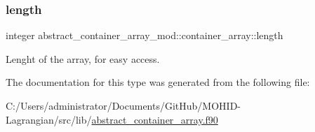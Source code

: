 \subsubsection{\texorpdfstring{length}{length}}
{\footnotesize\ttfamily integer abstract\+\_\+container\+\_\+array\+\_\+mod\+::container\+\_\+array\+::length\hspace{0.3cm}{\ttfamily [private]}}



Lenght of the array, for easy access. 



The documentation for this type was generated from the following file\+:\begin{DoxyCompactItemize}
\item 
C\+:/\+Users/administrator/\+Documents/\+Git\+Hub/\+M\+O\+H\+I\+D-\/\+Lagrangian/src/lib/\hyperlink{abstract__container__array_8f90}{abstract\+\_\+container\+\_\+array.\+f90}\end{DoxyCompactItemize}
